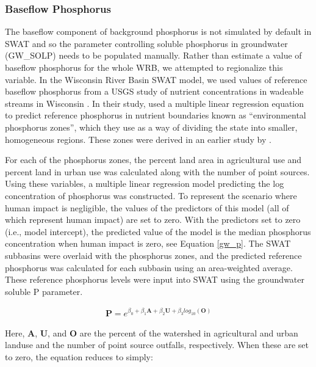 \subsubsection{Baseflow Phosphorus}\label{sec:gwp}
	The baseflow component of background phosphorus is not simulated by default in SWAT and so the parameter controlling soluble phosphorus in groundwater (GW\_SOLP) needs to be populated manually. Rather than estimate a value of baseflow phosphorus for the whole WRB, we attempted to regionalize this variable. In the Wisconsin River Basin SWAT model, we used values of reference baseflow phosphorus from a USGS study of nutrient concentrations in wadeable streams in Wisconsin \citep{robertson_wadeable_2006}. In their study, \citet{robertson_wadeable_2006} used a multiple linear regression equation to predict reference phosphorus in nutrient boundaries known as ``environmental phosphorus zones'', which they use as a way of dividing the state into smaller, homogeneous regions. These zones were derived in an earlier study by \citet{robertson_phosphoruszones_2006}.

	
	For each of the phosphorus zones, the percent land area in agricultural use and percent land in urban use was calculated along with the number of point sources. Using these variables, a multiple linear regression model predicting the log concentration of phosphorus was constructed. To represent the scenario where human impact is negligible, the values of the predictors of this model (all of which represent human impact) are set to zero. With the predictors set to zero (i.e., model intercept), the predicted value of the model is the median phosphorus concentration when human impact is zero, see Equation \ref{gw_p}. The SWAT subbasins were overlaid with the phosphorus zones, and the predicted reference phosphorus was calculated for each subbasin using an area-weighted average. These reference phosphorus levels were input into SWAT using the groundwater soluble P parameter.
	
	
	\begin{eqnarray}
	\bm{P} = e^{\beta_0 + \beta_1 \bm{A} + \beta_2 \bm{U} + \beta_3 log_{10}(\bm{O})}
	\end{eqnarray}
		
	Here, $\bm{A}$, $\bm{U}$, and $\bm{O}$ are the percent of the watershed in agricultural and urban landuse and the number of point source outfalls, respectively. When these are set to zero, the equation reduces to simply:
	
